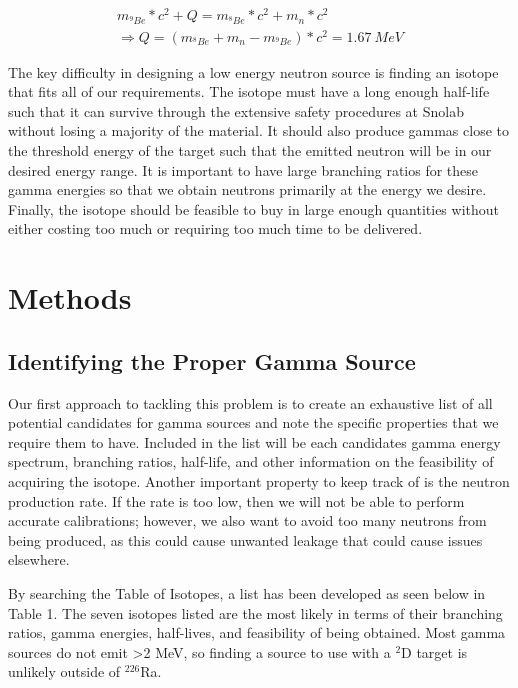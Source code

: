 \documentclass[%
12pt,
twoside,
reprint,
amsmath,amssymb,
aps,
]{article}
\begin{document}
	\begin{equation}
	\begin{aligned}	
	m_{^{9}Be} * c^{2} + Q = m_{^{8}Be} * c^{2} + m_{n} * c^{2} \\
	\Rightarrow Q = (m_{^{8}Be} + m_{n} - m_{^{9}Be}) * c^{2} = 1.67\ MeV
	\end{aligned}
	\end{equation}
	
	\par The key difficulty in designing a low energy neutron source is finding an isotope that fits all of our requirements. The isotope must have a long enough half-life such that it can survive through the extensive safety procedures at Snolab without losing a majority of the material. It should also produce gammas close to the threshold energy of the target such that the emitted neutron will be in our desired energy range. It is important to have large branching ratios for these gamma energies so that we obtain neutrons primarily at the energy we desire. Finally, the isotope should be feasible to buy in large enough quantities without either costing too much or requiring too much time to be delivered.
	
	\section{Methods}
	\subsection{Identifying the Proper Gamma Source}
	\par Our first approach to tackling this problem is to create an exhaustive list of all potential candidates for gamma sources and note the specific properties that we require them to have. Included in the list will be each candidates gamma energy spectrum, branching ratios, half-life, and other information on the feasibility of acquiring the isotope. Another important property to keep track of is the neutron production rate. If the rate is too low, then we will not be able to perform accurate calibrations; however, we also want to avoid too many neutrons from being produced, as this could cause unwanted leakage that could cause issues elsewhere.
	\par By searching the Table of Isotopes, a list has been developed as seen below in Table 1. The seven isotopes listed are the most likely in terms of their branching ratios, gamma energies, half-lives, and feasibility of being obtained. Most gamma sources do not emit >2 MeV, so finding a source to use with a $^{2}$D target is unlikely outside of $^{226}$Ra. 	
		
\end{document}
